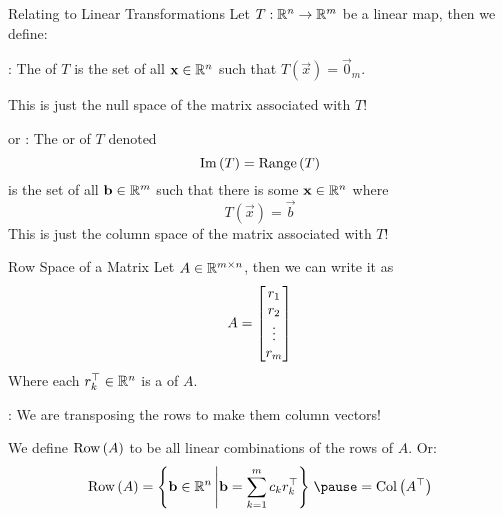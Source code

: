 \documentclass[xcoler=dvipsnames, aspectratio=169]{beamer}
\begin{document}
    \iftoggle{showSolutions}{
        \begin{frame}{$\colS{A}$ and $\nullS{A}$ Practice Continued}
            So, we have that 
            \[
                \nullS{A} =\Span{\bMat{-2\\-1\\1}}
            \]\pause
            \[
                \colS{A} = \Span{\bMat{1\\1\\2\\1},\bMat{1\\3\\5\\5}}
            \]\pause
            What do we notice about the dimension of these spaces?
        \end{frame}
    }{}
    \begin{frame}{Relating to Linear Transformations}
        \small
        Let $T:\mathbb{R}^n\rightarrow\mathbb{R}^m$ be a linear map, then we define:
        \begin{defn}
            : The  of $T$ is the set of all $\mathbf{x}\in\mathbb{R}^n$ such that
            $T(\vec{x}) = \vec{0}_m$.\pause

            This is just the null space of the matrix associated with $T$!
        \end{defn}
        \begin{defn}
             or : The  or  of $T$ denoted
            \[
                \mathrm{Im}\left(T\right)=\mathrm{Range}\left(T\right)
            \]
            is the set of all $\mathbf{b}\in\mathbb{R}^m$ such that there is some $\mathbf{x}\in\mathbb{R}^n$ where
            \[
                T(\vec{x}) = \vec{b}
            \]\pause
            This is just the column space of the matrix associated with $T$!
        \end{defn}
    \end{frame}
    \begin{frame}{Row Space of a Matrix}
        Let $A\in\mathbb{R}^{m\times n}$, then we can write it as
        \[
            A = \begin{bmatrix}r_1\\r_2\\\vdots\\r_m\end{bmatrix}
        \]
        Where each $r_k^\top\in\mathbb{R}^n$ is a  of $A$. 

        : We are transposing the rows to make them column vectors!\pause

        We define $\mathrm{Row}\left(A\right)$ to be all linear combinations of the rows of $A$. Or:
        \[
            \rowS{A} = \set{\vec{b}\in\R^n}{\vec{b} = \sum_{k=1}^mc_kr_k^\top}\pause = \colS{A^\top}
        \]
    \end{frame}
\end{document}
